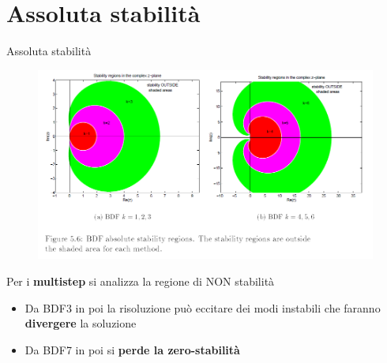 \documentclass[aspectratio=169, 10pt, handout,usenames,dvipsnames]{beamer}
\begin{document}
 \section{Assoluta stabilità}%
    \begin{frame}{Assoluta stabilità}
        \begin{figure}
        \centering
        \includegraphics[width=.7\linewidth]{fig7.png}
        \label{fig:abs_stability}
        \end{figure}
        Per i \textbf{multistep} si analizza la regione di NON stabilità
        \begin{itemize}
            \item Da BDF3 in poi la risoluzione può eccitare dei modi instabili che faranno \textbf{divergere} la soluzione
            \item Da BDF7 in poi si \textbf{perde la zero-stabilità}
        \end{itemize}
    \end{frame}
    
\end{document}
